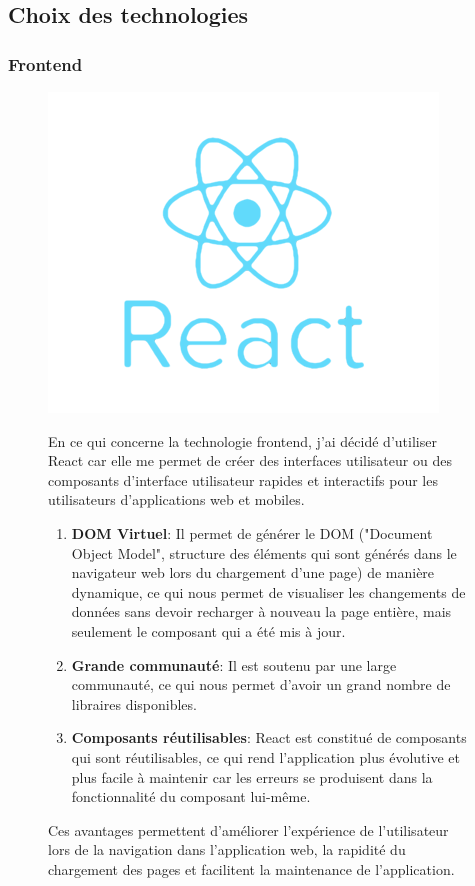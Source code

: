 \subsection{Choix des technologies}

\subsubsection{Frontend}
\begin{figure}[H]
  \begin{minipage}{.3\textwidth}
    \includegraphics[width=0.75\linewidth]{img/react.png}
  \end{minipage}
  \begin{minipage}{.7\textwidth}
    
    En ce qui concerne la technologie frontend, j'ai décidé d'utiliser React car elle me permet de créer des interfaces utilisateur ou des composants d'interface utilisateur rapides et interactifs pour les utilisateurs d'applications web et mobiles.
    \begin{enumerate}
      \item \textbf{DOM Virtuel}: Il permet de générer le DOM ("Document Object Model", structure des éléments qui sont générés dans le navigateur web lors du chargement d'une page) de manière dynamique, ce qui nous permet de visualiser les changements de données sans devoir recharger à nouveau la page entière, mais seulement le composant qui a été mis à jour.
      \item \textbf{Grande communauté}: Il est soutenu par une large communauté, ce qui nous permet d'avoir un grand nombre de libraires disponibles.
      \item \textbf{Composants réutilisables}: React est constitué de composants qui sont réutilisables, ce qui rend l'application plus évolutive et plus facile à maintenir car les erreurs se produisent dans la fonctionnalité du composant lui-même.
    \end{enumerate}
    Ces avantages permettent d'améliorer l'expérience de l'utilisateur lors de la navigation dans l'application web, la rapidité du chargement des pages et facilitent la maintenance de l'application.
  \end{minipage}
\end{figure}

